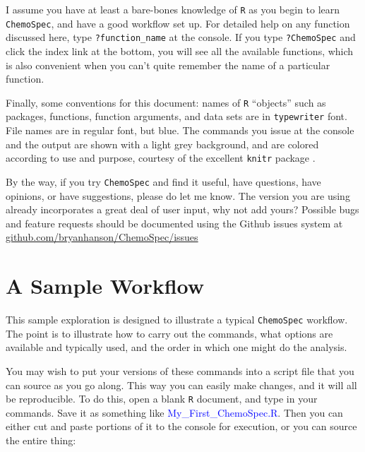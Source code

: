 \documentclass[letter,10pt,twocolumn,twoside,printwatermark=false]{pinp}
\begin{document}
I assume you have at least a bare-bones knowledge of \texttt{R} as you
begin to learn \texttt{ChemoSpec}, and have a good workflow set up. For
detailed help on any function discussed here, type
\texttt{?function\_name} at the console. If you type \texttt{?ChemoSpec}
and click the index link at the bottom, you will see all the available
functions, which is also convenient when you can't quite remember the
name of a particular function.

Finally, some conventions for this document: names of \texttt{R}
``objects'' such as packages, functions, function arguments, and data
sets are in \texttt{typewriter} font. File names are in regular font,
but blue. The commands you issue at the console and the output are shown
with a light grey background, and are colored according to use and
purpose, courtesy of the excellent \texttt{knitr} package
\citep{knitr-pkg}.

By the way, if you try \texttt{ChemoSpec} and find it useful, have
questions, have opinions, or have suggestions, please do let me know.
The version you are using already incorporates a great deal of user
input, why not add yours? Possible bugs and feature requests should be
documented using the Github issues system at
\href{http://github.com/bryanhanson/ChemoSpec/issues}{github.com/bryanhanson/ChemoSpec/issues}

\hypertarget{a-sample-workflow}{%
\section{A Sample Workflow}\label{a-sample-workflow}}

This sample exploration is designed to illustrate a typical
\texttt{ChemoSpec} workflow. The point is to illustrate how to carry out
the commands, what options are available and typically used, and the
order in which one might do the analysis.

You may wish to put your versions of these commands into a script file
that you can source as you go along. This way you can easily make
changes, and it will all be reproducible. To do this, open a blank
\texttt{R} document, and type in your commands. Save it as something
like \textcolor{blue}{My\_First\_ChemoSpec.R}. Then you can either cut
and paste portions of it to the console for execution, or you can source
the entire thing:

\begin{Shaded}
\begin{Highlighting}[]
\NormalTok{(}\NormalTok{)}
\end{Highlighting}
\end{Shaded}
\end{document}
